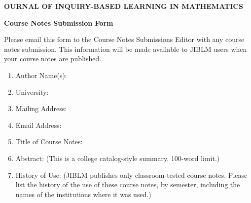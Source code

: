 \documentclass[12pt]{article}
\begin{document}
\begin{center}
{\bf {}OURNAL OF {\Large I}NQUIRY-{\Large B}ASED
{\Large L}EARNING
\medskip
\noindent IN {\Large M}ATHEMATICS}
\end{center}

\medskip
\begin{center}
{\large \bf Course Notes Submission Form}
\end{center}

Please email this form to the Course Notes Submissions Editor with any course notes submission. This information will be made available to JIBLM users when your course notes are published.

\begin{enumerate}

\item Author Name(s):

\item University:

\item Mailing Address:

\item Email Address:

\item Title of Course Notes:

\item Abstract: (This is a college catalog-style summary, 100-word limit.)

\item History of Use: (JIBLM publishes only classroom-tested course notes. Please list the history of the use of these course notes, by semester, including the names of the institutions where it was used.)
\end{enumerate}
\end{document}
